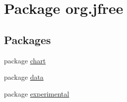 \hypertarget{namespaceorg_1_1jfree}{}\section{Package org.\+jfree}
\label{namespaceorg_1_1jfree}
\subsection*{Packages}
\begin{DoxyCompactItemize}
\item 
package \mbox{\hyperlink{namespaceorg_1_1jfree_1_1chart}{chart}}
\item 
package \mbox{\hyperlink{namespaceorg_1_1jfree_1_1data}{data}}
\item 
package \mbox{\hyperlink{namespaceorg_1_1jfree_1_1experimental}{experimental}}
\end{DoxyCompactItemize}
